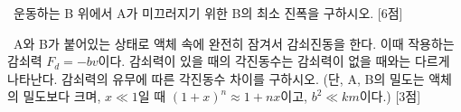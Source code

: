 \documentclass[]{gshs_exam_test} %
\begin{document}
\begin{multicols*}{2}
\begin{problems}
\begin{subproblems}
\vspace{15em} %

\subprob \ssh\ 운동하는 B 위에서 A가 미끄러지기 위한 B의 최소 진폭을 구하시오. [6점]

\vspace*{\fill} %
\columnbreak %


\vspace*{-0.8em} %

\subprob \ssh\ A와 B가 붙어있는 상태로 액체 속에 완전히 잠겨서 감쇠진동을 한다. 이때 작용하는 감쇠력 $F_d =-bv$이다. 감쇠력이 있을 때의 각진동수는 감쇠력이 없을 때와는 다르게 나타난다. 감쇠력의 유무에 따른 각진동수 차이를 구하시오. (단, A, B의 밀도는 액체의 밀도보다 크며, $x\ll 1$일 때 $(1+x)^n \approx 1+nx$이고, $b^2 \ll km$이다.) [3점]
\end{subproblems} %


\vspace*{\fill}  %
\columnbreak %



\end{problems}
\end{multicols*}
\end{document}
